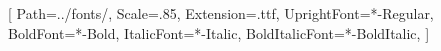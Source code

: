 \usepackage{fontspec}

\setmonofont{JetBrainsMonoNL}[
    Path=../fonts/,
    Scale=.85,
    Extension=.ttf,
    UprightFont=*-Regular,
    BoldFont=*-Bold,
    ItalicFont=*-Italic,
    BoldItalicFont=*-BoldItalic,
]
